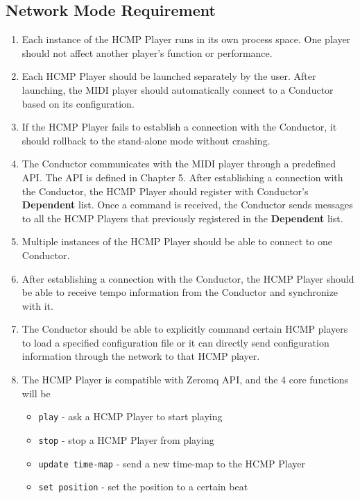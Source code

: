 \subsection{Network Mode Requirement}
\begin{enumerate}
  \item Each instance of the HCMP Player runs in its own process space. One player 
        should not affect another player's function or performance. 
        
  \item Each HCMP Player should be launched separately by the user. After 
        launching, the MIDI player should automatically connect to a Conductor 
        based on its configuration.

  \item If the HCMP Player fails to establish a connection with the Conductor, 
        it should rollback to the stand-alone mode without crashing.

  \item The Conductor communicates with the MIDI player through a predefined API. 
        The API is defined in Chapter 5. After establishing a connection with 
        the Conductor, the HCMP Player should register with Conductor's 
        {\bf Dependent} list. Once a command is received, the Conductor sends 
        messages to all the HCMP Players that previously registered in the 
        {\bf Dependent} list. 

  \item Multiple instances of the HCMP Player should be able to connect to one Conductor. 
  \item After establishing a connection with the Conductor, the HCMP Player 
        should be able to receive tempo information from the Conductor and 
        synchronize with it.     
  \item The Conductor should be able to explicitly command certain HCMP players to 
        load a specified configuration file or it can directly 
        send configuration information through the network to that HCMP player.
  \item 
    The HCMP Player is compatible with Zeromq API, 
    and the 4 core functions will be
    \begin{itemize}
      \item \texttt{play} - ask a HCMP Player to start playing 
      \item \texttt{stop} - stop a HCMP Player from playing 
      \item \texttt{update time-map} - send a new time-map to the HCMP Player 
      \item \texttt{set position} - set the position to a certain beat
    \end{itemize}
\end{enumerate}

